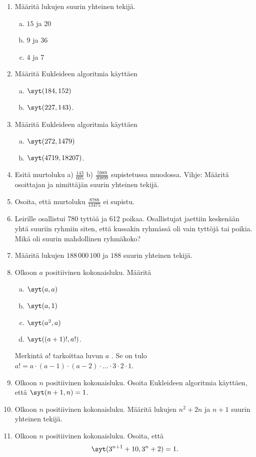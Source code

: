 \begin{enumerate}

\item Määritä lukujen suurin yhteinen tekijä.
\begin{enumerate}[a)]
\item $15$ ja $20$
\item $9$ ja $36$
\item $4$ ja $7$
\end{enumerate}

\item Määritä Eukleideen algoritmia käyttäen
\begin{enumerate}[a)]
\item $\syt(184,152)$
\item $\syt(227,143)$.
\end{enumerate}

\item Määritä Eukleideen algoritmia käyttäen
\begin{enumerate}[a)]
\item $\syt(272,1479)$
\item $\syt(4719,18207)$.
\end{enumerate}

\item Esitä murtoluku  a) $\frac{143}{605}$  b) $\frac{5989}{30899}$  supistetussa muodossa. Vihje: Määritä osoittajan ja nimittäjän suurin yhteinen tekijä.

\item Osoita, että murtoluku $\frac{8788}{13475}$ ei supistu.

\item Leirille osallistui 780 tyttöä ja 612 poikaa. Osallistujat jaettiin keskenään yhtä suuriin ryhmiin siten, että kussakin ryhmässä oli vain tyttöjä tai poikia. Mikä oli suurin mahdollinen ryhmäkoko?

\item
Määritä lukujen $188\, 000\, 100$ ja $188$ suurin yhteinen tekijä.

\item Olkoon $a$ positiivinen kokonaisluku. Määritä
\begin{enumerate}[a)]
\item $\syt(a,a)$
\item $\syt(a,1)$
\item $\syt(a^2,a)$
\item $\syt((a+1)!,a!)$.
\end{enumerate}
Merkintä $a!$ tarkoittaa luvun $a$ . Se on tulo $a! = a \cdot (a-1) \cdot (a-2) \cdot \ldots \cdot 3 \cdot 2 \cdot 1$.

\item Olkoon $n$ positiivinen kokonaisluku. Osoita Eukleideen algoritmia käyttäen, että $\syt(n+1,n)=1$.

\item Olkoon $n$ positiivinen kokonaisluku. Määritä lukujen $n^2 + 2n$ ja $n + 1$ suurin yhteinen tekijä.

\item Olkoon $n$ positiivinen kokonaisluku. Osoita, että
\[
\syt(3^{n+1} + 10,3^n + 2)=1.
\]

\end{enumerate}

